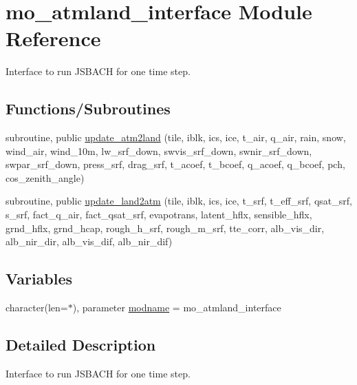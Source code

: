 \hypertarget{namespacemo__atmland__interface}{}\section{mo\+\_\+atmland\+\_\+interface Module Reference}
\label{namespacemo__atmland__interface}


Interface to run J\+S\+B\+A\+C\+H for one time step.  


\subsection*{Functions/\+Subroutines}
\begin{DoxyCompactItemize}
\item 
subroutine, public \hyperlink{namespacemo__atmland__interface_a7bffd74cd79c834a484b49e338156eb0}{update\+\_\+atm2land} (tile, iblk, ics, ice, t\+\_\+air, q\+\_\+air, rain, snow, wind\+\_\+air, wind\+\_\+10m, lw\+\_\+srf\+\_\+down, swvis\+\_\+srf\+\_\+down, swnir\+\_\+srf\+\_\+down, swpar\+\_\+srf\+\_\+down, press\+\_\+srf, drag\+\_\+srf, t\+\_\+acoef, t\+\_\+bcoef, q\+\_\+acoef, q\+\_\+bcoef, pch, cos\+\_\+zenith\+\_\+angle)
\item 
subroutine, public \hyperlink{namespacemo__atmland__interface_a7fe902b72cc2b66e523616662e7798d6}{update\+\_\+land2atm} (tile, iblk, ics, ice, t\+\_\+srf, t\+\_\+eff\+\_\+srf, qsat\+\_\+srf, s\+\_\+srf, fact\+\_\+q\+\_\+air, fact\+\_\+qsat\+\_\+srf, evapotrans, latent\+\_\+hflx, sensible\+\_\+hflx, grnd\+\_\+hflx, grnd\+\_\+hcap, rough\+\_\+h\+\_\+srf, rough\+\_\+m\+\_\+srf, tte\+\_\+corr, alb\+\_\+vis\+\_\+dir, alb\+\_\+nir\+\_\+dir, alb\+\_\+vis\+\_\+dif, alb\+\_\+nir\+\_\+dif)
\end{DoxyCompactItemize}
\subsection*{Variables}
\begin{DoxyCompactItemize}
\item 
character(len=$\ast$), parameter \hyperlink{namespacemo__atmland__interface_ab0a7407e48789dbb1c7fef4404d595f4}{modname} = \textquotesingle{}mo\+\_\+atmland\+\_\+interface\textquotesingle{}
\end{DoxyCompactItemize}


\subsection{Detailed Description}
Interface to run J\+S\+B\+A\+C\+H for one time step. 

